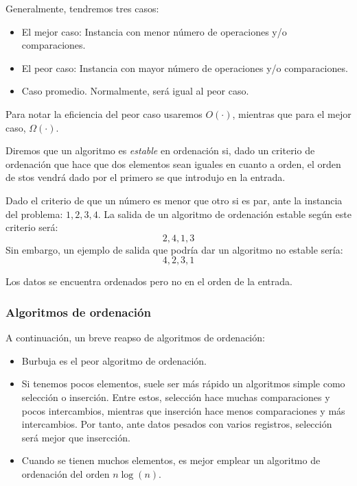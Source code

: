 Generalmente, tendremos tres casos:
\begin{itemize}
    \item El mejor caso: Instancia con menor número de operaciones y/o comparaciones.
    \item El peor caso: Instancia con mayor número de operaciones y/o comparaciones.
    \item Caso promedio. Normalmente, será igual al peor caso.
\end{itemize}
Para notar la eficiencia del peor caso usaremos $O(\cdot)$, mientras que para el mejor caso, $\Omega(\cdot)$.

Diremos que un algoritmo es \emph{estable} en ordenación si, dado un criterio de ordenación que hace que dos elementos sean iguales en cuanto a orden, el orden de stos vendrá dado por el primero se que introdujo en la entrada. 
\begin{ejemplo}
    Dado el criterio de que un número es menor que otro si es par, ante la instancia del problema: $1, 2, 3, 4$. La salida de un algoritmo de ordenación estable según este criterio será:
\[
2, 4, 1, 3
\]
Sin embargo, un ejemplo de salida que podría dar un algoritmo no estable sería:
\[
4, 2, 3, 1
\]

Los datos se encuentra ordenados pero no en el orden de la entrada.
\end{ejemplo}

\subsubsection{Algoritmos de ordenación}
A continuación, un breve reapso de algoritmos de ordenación:

\begin{itemize}
    \item Burbuja es el peor algoritmo de ordenación.
    \item Si tenemos pocos elementos, suele ser más rápido un algoritmos simple como selección o inserción. Entre estos, selección hace muchas comparaciones y pocos intercambios, mientras que inserción hace menos comparaciones y más intercambios. Por tanto, ante datos pesados con varios registros, selección será mejor que insercción.
    \item Cuando se tienen muchos elementos, es mejor emplear un algoritmo de ordenación del orden $n\log(n)$.
\end{itemize}



